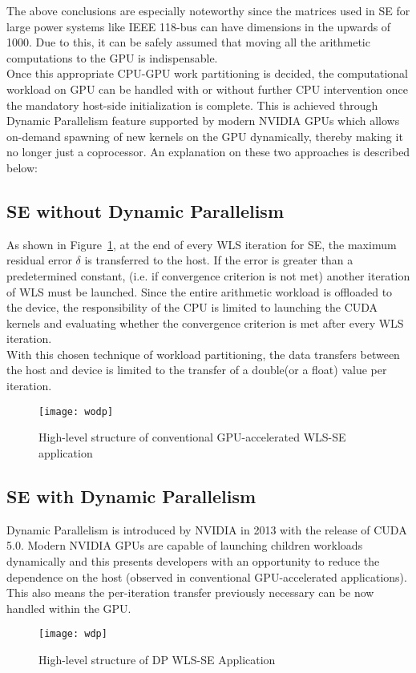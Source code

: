 \documentclass[thesis.tex]{subfiles}
\begin{document}
The above conclusions are especially noteworthy since the matrices used in SE for large power systems like IEEE 118-bus can have dimensions in the upwards of 1000. Due to this, it can be safely assumed that moving all the arithmetic computations to the GPU is indispensable. \\
Once this appropriate CPU-GPU work partitioning is decided, the computational workload on GPU can be handled with or without further CPU intervention once the mandatory host-side initialization is complete. This is achieved through Dynamic Parallelism feature supported by modern NVIDIA GPUs which allows on-demand spawning of new kernels on the GPU dynamically, thereby making it no longer just a coprocessor. An explanation on these two approaches is described below:

\subsection{SE without Dynamic Parallelism}\label{sec:wodp}
As shown in Figure~\ref{fig:wodp}, at the end of every WLS iteration for SE, the maximum residual error $\delta$ is transferred to the host. If the error is greater than a predetermined constant, (i.e. if convergence criterion is not met) another iteration of WLS must be launched. Since the entire arithmetic workload is offloaded to the device, the responsibility of the CPU is limited to launching the CUDA kernels and evaluating whether the convergence criterion is met after every WLS iteration. \\
With this chosen technique of workload partitioning, the data transfers between the host and device is limited to the transfer of a double(or a float) value per iteration. 
\begin{figure}[H]
	\centering
	\texttt{[image: wodp]}
	\caption{High-level structure of conventional GPU-accelerated WLS-SE application}
	\label{fig:wodp}
\end{figure}

\subsection{SE with Dynamic Parallelism}\label{sec:wdp}
Dynamic Parallelism is introduced by NVIDIA in 2013 with the release of CUDA 5.0. Modern NVIDIA GPUs are capable of launching children workloads dynamically and this presents developers with an opportunity to reduce the dependence on the host (observed in conventional GPU-accelerated applications). This also means the per-iteration transfer previously necessary can be now handled within the GPU. 
\begin{figure}[H]
	\centering
	\texttt{[image: wdp]}
	\caption{High-level structure of DP WLS-SE Application}
	\label{fig:wdp}
\end{figure}
\end{document}
